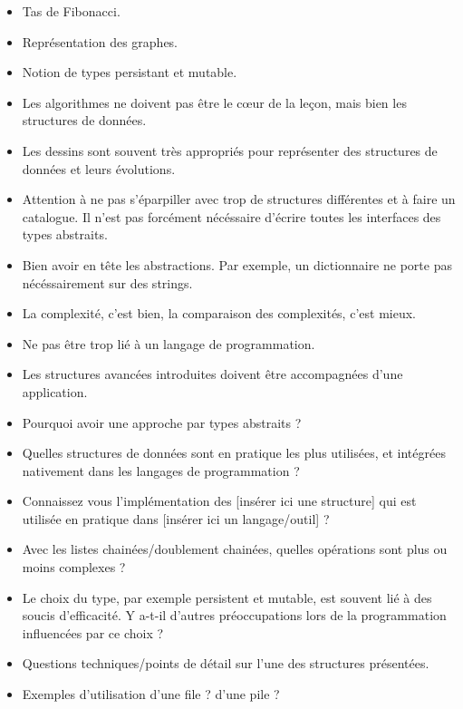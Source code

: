 \documentclass{agregfiche}
\begin{document}
\secidees

\begin{itemize}
	\item Tas de Fibonacci.
	\item Représentation des graphes.
    	\item Notion de types persistant et mutable.
\end{itemize}

\secpieges

\begin{itemize}
	\item Les algorithmes ne doivent pas être le c\oe ur de la leçon, mais bien les structures de données.
	\item Les dessins sont souvent très appropriés pour représenter des structures de données et leurs évolutions.
   	\item Attention à ne pas s'éparpiller avec trop de structures différentes et à faire un catalogue. Il n'est pas forcément nécéssaire d'écrire toutes les interfaces des types abstraits.
	\item Bien avoir en tête les abstractions. Par exemple, un dictionnaire ne porte pas nécéssairement sur des strings.
	\item La complexité, c'est bien, la comparaison des complexités, c'est mieux.
	\item Ne pas être trop lié à un langage de programmation.
	\item Les structures avancées introduites doivent être accompagnées d'une application.
\end{itemize}

\secquestionsclassiques

\begin{itemize}
	\item Pourquoi avoir une approche par types abstraits ?
	\item Quelles structures de données sont en pratique les plus
	utilisées, et intégrées nativement dans les langages de
	programmation ?
	\item Connaissez vous l'implémentation des [insérer ici une
	structure] qui est utilisée en pratique dans [insérer ici un langage/outil] ?
	\item Avec les listes chainées/doublement chainées, quelles
	opérations sont plus ou moins complexes ?
	\item Le choix du type, par exemple persistent et mutable, est souvent lié à des soucis d'efficacité. Y a-t-il d'autres préoccupations lors de la programmation influencées par ce choix ?
    \item Questions techniques/points de détail sur l'une des 
    structures présentées.
    \item Exemples d'utilisation d'une file ? d'une pile ?

\end{itemize}
\end{document}
